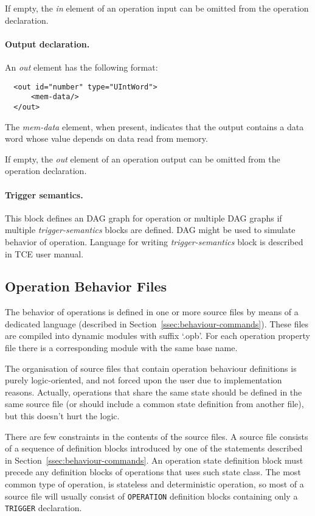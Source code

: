 \documentclass[twoside]{tce}
\begin{document}
If empty, the \emph{in} element of an operation input can be omitted from
the operation declaration.

\paragraph{Output declaration.}
An \emph{out} element has the following format:
\begin{verbatim}
  <out id="number" type="UIntWord">
      <mem-data/>
  </out>
\end{verbatim}


The \emph{mem-data} element, when present, indicates that the output
contains a data word whose value depends on data read from memory.

If empty, the \emph{out} element of an operation output can be omitted from
the operation declaration.

\paragraph{Trigger semantics.}

This block defines an DAG graph for operation or multiple DAG graphs if multiple
\emph{trigger-semantics} blocks are defined. DAG might be used to simulate 
behavior of operation. Language for writing \emph{trigger-semantics} block is 
described in TCE user manual.

\subsection{Operation Behavior Files}

The behavior of operations is defined in one or more source files by means
of a dedicated language (described in
Section~\ref{ssec:behaviour-commands}).
%
These files are compiled into dynamic modules with suffix `.opb'.  For each
operation property file there is a corresponding module with the same base
name.

The organisation of source files that contain operation behaviour
definitions is purely logic-oriented, and not forced upon the user due to
implementation reasons.  Actually, operations that share the same state
should be defined in the same source file (or should include a common state
definition from another file), but this doesn't hurt the logic.

There are few constraints in the contents of the source files. A source file
consists of a sequence of definition blocks introduced by one of the
statements described in Section~\ref{ssec:behaviour-commands}. An operation
state definition block must precede any definition blocks of operations that
uses such state class. The most common type of operation, is stateless and
deterministic operation, so most of a source file will usually consist of
\verb#OPERATION# definition blocks containing only a \verb#TRIGGER#
declaration.
\end{document}
